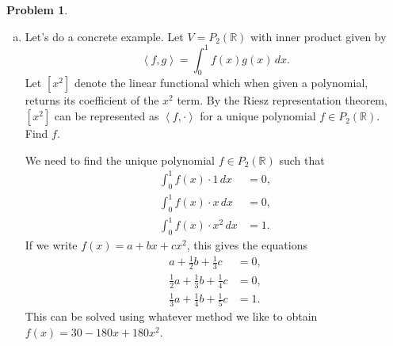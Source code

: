 \documentclass[11pt,oneside]{amsart}
\theoremstyle{definition}
\newtheorem{problem}{Problem}
\newcommand{\bR}{\mathbb{R}}
\newcommand{\innerprod}[1]{\left\langle#1\right\rangle}
\begin{document}
\begin{problem}
\begin{enumerate}[(a)]
            \item Let's do a concrete example. Let $V=P_2(\bR)$ with inner product given by
            \[\innerprod{f,g}=\int_0^1 f(x)g(x)\,dx.\]
            Let $[x^2]$ denote the linear functional which when given a polynomial, returns its coefficient of the $x^2$ term. By the Riesz representation theorem, $[x^2]$ can be represented as $\innerprod{f,\cdot}$ for a unique polynomial $f\in P_2(\bR)$. Find $f$.
            \begin{solution}
                We need to find the unique polynomial $f\in P_2(\bR)$ such that
                \begin{align*}
                    \int_0^1 f(x)\cdot 1\,dx &= 0,\\
                    \int_0^1 f(x)\cdot x\,dx &= 0,\\
                    \int_0^1 f(x)\cdot x^2\,dx &= 1.
                \end{align*}
                If we write $f(x)=a+bx+cx^2$, this gives the equations
                \begin{align*}
                    a+\frac 12b+\frac13c &= 0,\\
                    \frac12a+\frac13b+\frac14c &= 0,\\
                    \frac13a+\frac14b+\frac15c &= 1.
                \end{align*}
                This can be solved using whatever method we like to obtain $f(x)=30-180x+180x^2$.
            \end{solution}
        \end{enumerate}
    \end{problem}
    
\end{document}
